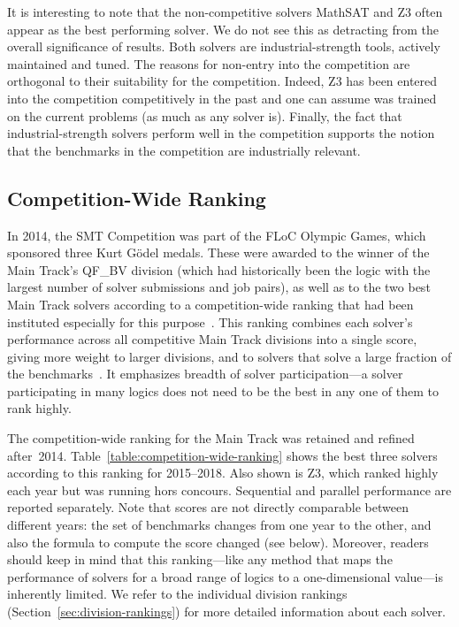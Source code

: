 \documentclass[dvipsnames,table,twoside,11pt]{article}
\newcommand{\maintrack}{Main Track\xspace}
\begin{document}
It is interesting to note that the non-competitive solvers MathSAT and Z3 often appear as the best performing solver. We do not see this as detracting from the overall significance of results. Both solvers are industrial-strength tools, actively maintained and tuned. The reasons for non-entry into the competition are orthogonal to their suitability for the competition. Indeed, Z3 has been entered into the competition competitively in the past and one can assume was trained on the current problems (as much as any solver is). Finally, the fact that industrial-strength solvers perform well in the competition supports the notion that the benchmarks in the competition are industrially relevant.








\subsection{Competition-Wide Ranking}
\label{sec:floc}

In 2014, the SMT Competition was part of the FLoC Olympic Games, which
sponsored three Kurt G\"odel medals.  These were awarded to the winner
of the \maintrack's QF\_BV division (which had historically been the
logic with the largest number of solver submissions and job pairs), as
well as to the two best \maintrack solvers according to a
competition-wide ranking that had been instituted especially for this
purpose~\cite{CDW14}.  This ranking combines each solver's performance
across all competitive \maintrack divisions into a single score,
giving more weight to larger divisions, and to solvers that solve a
large fraction of the benchmarks~\cite{rules18}.  It emphasizes
breadth of solver participation---a solver participating in many
logics does not need to be the best in any one of them to rank highly.

The competition-wide ranking for the \maintrack was retained and
refined after~2014.  Table~\ref{table:competition-wide-ranking} shows
the best three solvers according to this ranking for 2015--2018.  Also
shown is Z3, which ranked highly each year but was running hors
concours.  Sequential and parallel performance are reported
separately.
%
Note that scores are not directly comparable between different years:
the set of benchmarks changes from one year to the other, and also the
formula to compute the score changed (see below).  Moreover, readers
should keep in mind that this ranking---like any method that maps the
performance of solvers for a broad range of logics to a
one-dimensional value---is inherently limited.  We refer to the
individual division rankings (Section~\ref{sec:division-rankings}) for
more detailed information about each solver.
\end{document}
